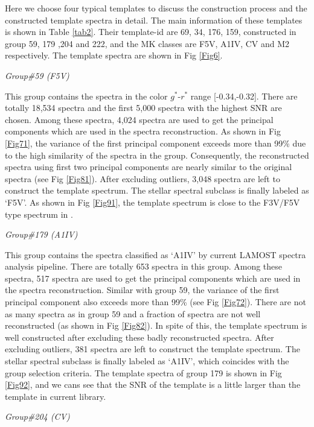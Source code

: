 \documentclass[manuscript]{aastex}
\begin{document}
Here we choose four typical templates  to  discuss the construction process and the constructed template spectra in detail.
The main information of these templates is shown in Table \ref{tab2}.
Their template-id are 69, 34, 176, 159,
constructed in group 59, 179 ,204 and 222, and 
the MK classes are F5V, A1IV, CV and M2 respectively.
The template spectra are  shown in Fig \ref{Fig6}.


\emph{Group\#59 (F5V)}

This group contains the spectra in the color $g^*$-$r^*$ range [-0.34,-0.32].
There are totally 18,534 spectra and the first 5,000 spectra with the highest SNR are chosen.
Among these spectra, 4,024 spectra are used to get the principal components which are used in the spectra reconstruction.
As shown in Fig \ref{Fig71},  the variance of the first  principal component  exceeds more than 99\% due to the high similarity of the spectra in the group.
Consequently, the reconstructed spectra using first two  principal components are nearly similar to the original spectra (see Fig \ref{Fig81}).
After excluding outliers, 3,048 spectra are left to construct the template spectrum.
The stellar spectral subclass is finally labeled as `F5V'.
As shown in Fig \ref{Fig91}, the template spectrum is close to the F3V/F5V type spectrum in \cite{bolton2012spectral}.



\emph{Group\#179 (A1IV)} 

This group contains the spectra classified as `A1IV' by current LAMOST spectra analysis pipeline.
There are totally 653 spectra in this group.
Among these spectra, 517 spectra are used to get the principal components which are used in the spectra reconstruction.
Similar with group 59, the variance of the first  principal component also exceeds more than 99\%  (see Fig \ref{Fig72}).
There are not as many spectra as in group 59 and a fraction of  spectra are not well reconstructed (as shown in Fig \ref{Fig82}).
In spite of this, the template spectrum is well constructed after excluding these badly reconstructed spectra.
After excluding outliers, 381 spectra are left to construct the template spectrum.
The stellar spectral subclass is finally labeled as `A1IV',
which coincides with the group selection criteria.
The template spectra of group 179 is  shown in Fig \ref{Fig92},
and we cans see that the SNR of the template is a little larger than the template in  current library.



\emph{Group\#204 (CV)}
\end{document}

